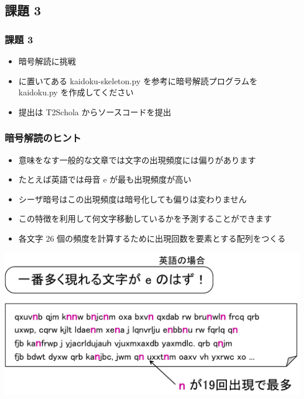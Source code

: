 \subsection{課題 3}
\begin{frame}
\frametitle{課題 3}
  \begin{itemize}
\item 暗号解読に挑戦
\item \href{https://sites.google.com/presystems.xyz/elementarycs/top}{}に置いてある kaidoku-skeleton.py を参考に暗号解読プログラムを kaidoku.py を作成してください
\item 提出は T2Schola からソースコードを提出
  \end{itemize}
\end{frame}
\begin{frame}
\frametitle{暗号解読のヒント}
  \begin{itemize}
\item 意味をなす一般的な文章では文字の出現頻度には偏りがあります
\item たとえば英語では母音 e が最も出現頻度が高い
\item シーザ暗号はこの出現頻度は暗号化しても偏りは変わりません
\item この特徴を利用して何文字移動しているかを予測することができます
\item 各文字 26 個の頻度を計算するために出現回数を要素とする配列をつくる
  \end{itemize}
  \begin{center}
\includegraphics[scale=0.3]{./Figure/elementaryCS-figHintForCryptoanalysis.pdf}
  \end{center}
\end{frame}
